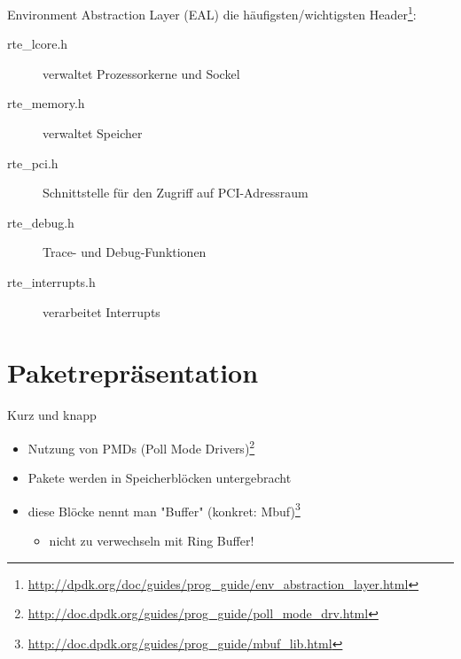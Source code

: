 \documentclass{beamer}
\begin{document}
\begin{frame}{Environment Abstraction Layer (EAL)}
    die häufigsten/wichtigsten Header\footnote{\href{http://dpdk.org/doc/guides/prog_guide/env_abstraction_layer.html}{http://dpdk.org/doc/guides/prog\_guide/env\_abstraction\_layer.html}}:
    \begin{description}
        \item[rte\_lcore.h] verwaltet Prozessorkerne und Sockel
        \item[rte\_memory.h] verwaltet Speicher
        \item[rte\_pci.h] Schnittstelle für den Zugriff auf PCI-Adressraum
        \item[rte\_debug.h] Trace- und Debug-Funktionen
        \item[rte\_interrupts.h] verarbeitet Interrupts
    \end{description}
\end{frame}

\section{Paketrepräsentation}
\begin{frame}{Kurz und knapp}
    \begin{itemize}
        \item Nutzung von PMDs (Poll Mode Drivers)\footnote{\href{http://doc.dpdk.org/guides/prog_guide/poll_mode_drv.html}{http://doc.dpdk.org/guides/prog\_guide/poll\_mode\_drv.html}}
        \item Pakete werden in Speicherblöcken untergebracht
        \item diese Blöcke nennt man "Buffer" (konkret: Mbuf)\footnote{\href{http://doc.dpdk.org/guides/prog_guide/mbuf_lib.html}{http://doc.dpdk.org/guides/prog\_guide/mbuf\_lib.html}}
              \begin{itemize}
                  \item nicht zu verwechseln mit Ring Buffer!
              \end{itemize}
    \end{itemize}
\end{frame}
\end{document}
